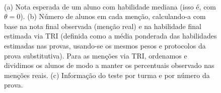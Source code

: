 \documentclass[a4paper]{report}
\begin{document}
\begin{figure} 
    \centering
    \\
\caption{(a) Nota esperada de um aluno com habilidade mediana (isso é, com $\theta=0$). (b) Número de alunos em cada menção, calculando-a com base na nota final observada (menção real) e na habilidade final estimada via TRI (definida como a média ponderada das habilidades estimadas nas provas, usando-se os mesmos pesos e protocolos da prova substitutiva). Para as menções via TRI, ordenamos e dividimos os alunos de modo a manter os percentuais observado nas menções reais. (c) Informação do teste por turma e por número da prova.}
\label{fig:Diversos.TRI}
\end{figure}
\end{document}
